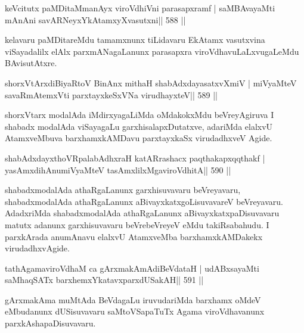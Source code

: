 
\begin{shl}
keVcitutx paMDitaMmanAyx viroVdhiVni parasapxramf |
saMBAvayaMti mAnAni savARNeyxYkAtamxyXvasutxni\hfill || 588 ||
\end{shl}

\begin{artha}
kelavaru paMDitareMdu tamamxnunx tiLidavaru EkAtamx vasutxvina viSayadalilx elAlx parxmANagaLanunx parasapxra viroVdhavuLaLxvugaLeMdu BAvisutAtxre.
\end{artha}



\begin{shl}
shorxVtArxdiBiyaRtoV BinAnx mithaH shabAdxdayasatxvXmiV |
miVyaMteV savaRmAtemxVti parxtayxkeSxVNa virudhayxteV\hfill || 589 ||
\end{shl}

\begin{artha}
shorxVtarx modalAda iMdirxyagaLiMda oMdakokxMdu beVreyAgiruva I shabadx modalAda viSayagaLu garxhisalapxDutatxve, adariMda elalxvU AtamxveMbuva barxhamxkAMDavu parxtayxkaSx virudadhxveV Agide.
\end{artha}



\begin{shl}
shabAdxdayxthoVRpalabAdhxraH katARrashacx paqthakapxqqthakf |
yasAmxdihAnumiVyaMteV tasAmxlilxMgaviroVdhitA\hfill || 590 ||
\end{shl}


\begin{artha}
shabadxmodalAda athaRgaLanunx garxhisuvavaru beVreyavaru, shabadxmodalAda athaRgaLanunx aBivayxkatxgoLisuvavareV beVreyavaru. AdadxriMda shabadxmodalAda athaRgaLanunx aBivayxkatxpaDisuvavaru matutx adanunx garxhisuvavaru beVrebeVreyeV eMdu takiRsabahudu. I parxkArada anumAnavu elalxvU AtamxveMba barxhamxkAMDakekx virudadhxvAgide.
\end{artha}


\begin{shl}
tathA\s\s gamaviroVdhaM ca gArxmakAmAdiBeVdataH |
udABxsayaMti saMhaqSATx barxhemxYkatavxparxdUSakAH\hfill || 591 ||
\end{shl}

\begin{artha}
gArxmakAma muMtAda BeVdagaLu iruvudariMda barxhamx oMdeV eMbudanunx dUSisuvavaru saMtoVSapaTuTx Agama viroVdhavanunx parxkAshapaDisuvavaru.
\end{artha}


